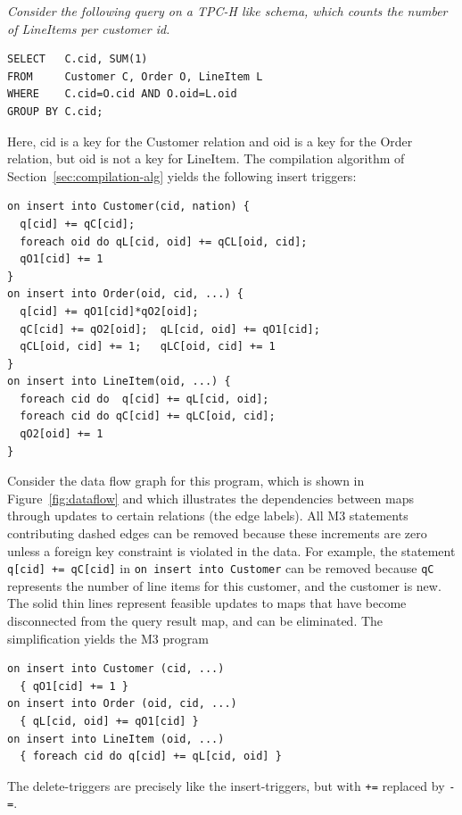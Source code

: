 \begin{example}\em
\label{ex:TPCH-Q12}
Consider the following query on a TPC-H like schema,
which counts the number of LineItems per customer id.
\begin{verbatim}
SELECT   C.cid, SUM(1)
FROM     Customer C, Order O, LineItem L
WHERE    C.cid=O.cid AND O.oid=L.oid
GROUP BY C.cid;
\end{verbatim}
Here, cid is a key for the Customer relation and oid is a key for the
Order relation, but oid is not a key for LineItem.
The compilation algorithm of Section~\ref{sec:compilation-alg} yields the
following insert triggers:
\begin{verbatim}
on insert into Customer(cid, nation) {
  q[cid] += qC[cid];
  foreach oid do qL[cid, oid] += qCL[oid, cid];
  qO1[cid] += 1
}
on insert into Order(oid, cid, ...) {
  q[cid] += qO1[cid]*qO2[oid];
  qC[cid] += qO2[oid];  qL[cid, oid] += qO1[cid];
  qCL[oid, cid] += 1;   qLC[oid, cid] += 1
}
on insert into LineItem(oid, ...) {
  foreach cid do  q[cid] += qL[cid, oid];
  foreach cid do qC[cid] += qLC[oid, cid];
  qO2[oid] += 1
}
\end{verbatim}

Consider the data flow graph for this program, which is shown in
Figure~\ref{fig:dataflow} and which illustrates the dependencies between
maps through updates to certain relations (the edge labels). All M3 statements
contributing dashed edges can be removed because these increments are zero unless a foreign key constraint is violated in the data. For example,
the statement {\tt q[cid] += qC[cid]} in {\tt on insert into Customer}
can be removed because {\tt qC} represents the number of line items for this
customer, and the customer is new. The solid thin lines represent
feasible updates to maps that have become disconnected from the query result
map, and can be eliminated.
The simplification yields the M3 program
\begin{verbatim}
on insert into Customer (cid, ...)
  { qO1[cid] += 1 }
on insert into Order (oid, cid, ...)
  { qL[cid, oid] += qO1[cid] }
on insert into LineItem (oid, ...)
  { foreach cid do q[cid] += qL[cid, oid] }
\end{verbatim}

The delete-triggers are precisely
like the insert-triggers, but with {\tt +=} replaced by {\tt -=}.
\punto
\end{example}


